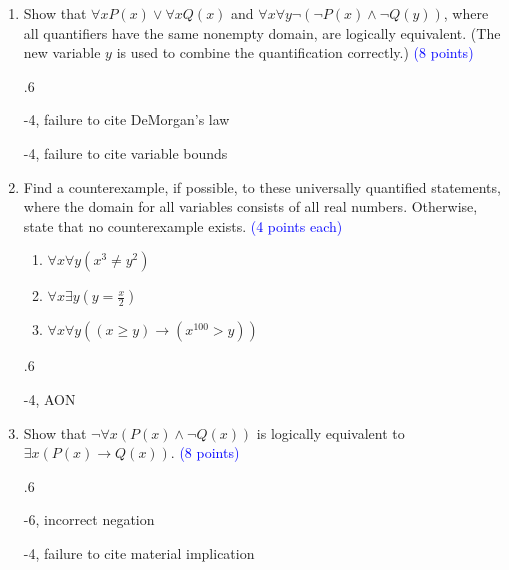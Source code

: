 \documentclass{article}
\newcommand{\pt}[1]{\textcolor{blue}{(#1 points)}}
\newcommand{\pte}[1]{\textcolor{blue}{(#1 points each)}}
\newenvironment{rubric}
{
\par
\begin{spacing}{.6}
\begin{itshape}
\color{red}

}
{
\end{itshape}
\end{spacing}
\par
}
\begin{document}
\begin{enumerate}
    \begin{rubric}
    -2 each, AON
    \end{rubric}
    
    \item{Show that $\forall x P(x) \lor \forall x Q(x)$ and $\forall x \forall y \neg(\neg P(x) \land \neg Q(y))$, where all quantifiers have the same nonempty domain, are logically equivalent. (The new variable $y$ is used to combine the quantification correctly.)} \pt 8
    
    \begin{rubric}
        -4, failure to cite DeMorgan's law
        
        -4, failure to cite variable bounds
    \end{rubric}
    
    \item{ Find a counterexample, if possible, to these universally quantified statements, where the domain for all variables consists of all real numbers. Otherwise, state that no counterexample exists. } \pte 4
    \begin{enumerate}
        \item $\forall x \forall y (x^3 \neq y^2)$
        \item $\forall x \exists y (y = \frac{x}{2})$
        \item $\forall x \forall y ((x \geq y) \rightarrow (x^{100} > y))$
    \end{enumerate}
    
    \begin{rubric}
        -4, AON
    \end{rubric}
    
    \item{Show that $\neg \forall x(P(x) \land \neg Q(x))$ is logically equivalent to $\exists x (P(x) \rightarrow Q(x))$}. \pt 8
    \begin{rubric}
    -6, incorrect negation
    
    -4, failure to cite material implication
    \end{rubric}
    
    
\end{enumerate}
\end{document}
